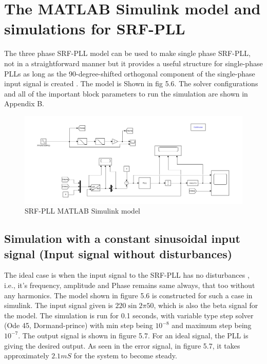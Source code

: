 \documentclass[a4paper,12pt]{iitmdiss}
\begin{document}
\section{The MATLAB Simulink model and simulations for SRF-PLL}

The three phase SRF-PLL model can be used to make single phase SRF-PLL, not in a straightforward manner but it provides a useful structure for single-phase PLLs as long as the 90-degree-shifted orthogonal component of the single-phase input signal is created \cite{silva2004performance}.  The model is Shown in fig 5.6. The solver configurations and all of the important block parameters to run the simulation are shown in Appendix B. 

\begin{figure}[hbt!]
    \centering
    \includegraphics[width=1.0\textwidth]{Screenshot 2021-05-29 005435.png}
    \caption{SRF-PLL MATLAB Simulink model}
\end{figure}



\subsection{Simulation with a constant sinusoidal input signal (Input signal without disturbances)}

The ideal case is when the input signal to the SRF-PLL has no disturbances , i.e., it's frequency, amplitude and Phase remains same always, that too without any harmonics. The model shown in figure 5.6 is constructed for such a case in simulink. 
The input signal given is $220\sin{2 \pi 50}$, which is also the beta signal for the model. The simulation is run for 0.1 seconds, with variable type step solver (Ode 45, Dormand-prince) with min step being $10^{-8}$ and maximum step being $10^{-7}$. The output signal is shown in figure 5.7. For an ideal signal, the PLL is giving the desired output. As seen in the error signal, in figure 5.7, it takes approximately $2.1 mS$ for the system to become steady. 
\end{document}
